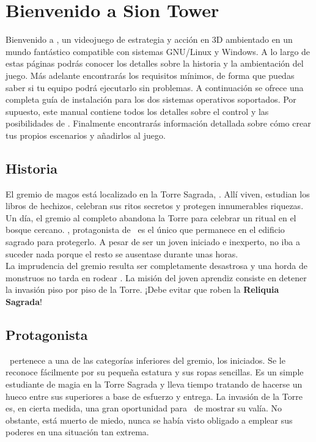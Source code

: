 \section*{Bienvenido a Sion Tower}

Bienvenido a \juego, un videojuego de estrategia y acción en 3D ambientado
en un mundo fantástico compatible con sistemas GNU/Linux y Windows. A lo
largo de estas páginas podrás conocer los detalles sobre la historia y la
ambientación del juego. Más adelante encontrarás los requisitos mínimos,
de forma que puedas saber si tu equipo podrá ejecutarlo sin problemas.
A continuación se ofrece una completa guía de instalación para los dos
sistemas operativos soportados. Por supuesto, este manual contiene todos
los detalles sobre el control y las posibilidades de \juego. Finalmente
encontrarás información detallada sobre cómo crear tus propios escenarios
y añadirlos al juego.\\


\subsection*{Historia}

El gremio de magos está localizado en la Torre Sagrada, \juego. Allí viven,
estudian los libros de hechizos, celebran sus ritos secretos y protegen
innumerables riquezas. Un día, el gremio al completo abandona la Torre para
celebrar un ritual en el bosque cercano. \prota, protagonista
de \juego\ es el único que permanece en el edificio sagrado para protegerlo.
A pesar de ser un joven iniciado e inexperto, no iba a suceder nada porque
el resto se ausentase durante unas horas.\\

La imprudencia del gremio resulta ser completamente desastrosa y una horda
de monstruos no tarda en rodear \juego. La misión del joven aprendiz consiste
en detener la invasión piso por piso de la Torre. ¡Debe evitar que roben
la \textbf{Reliquia Sagrada}!

\subsection*{Protagonista}

\prota\ pertenece a una de las categorías inferiores del gremio, los
iniciados. Se le reconoce fácilmente por su pequeña estatura y sus ropas
sencillas. Es un simple estudiante de magia en la Torre Sagrada y lleva
tiempo tratando de hacerse un hueco entre sus superiores a base de esfuerzo
y entrega. La invasión de la Torre es, en cierta medida, una gran oportunidad
para \prota\ de mostrar su valía. No obstante, está muerto de miedo, nunca
se había visto obligado a emplear sus poderes en una situación tan extrema.

